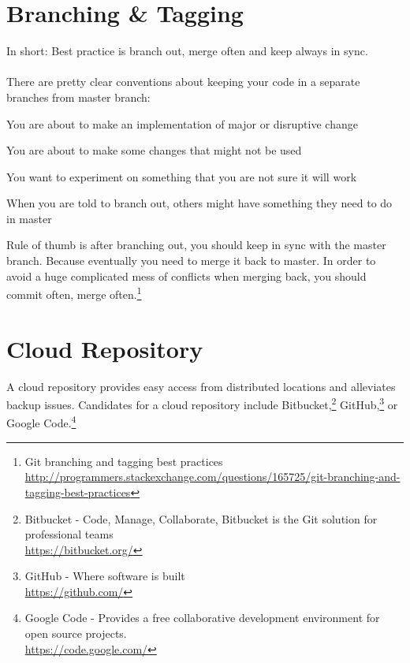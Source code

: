 \documentclass[12pt,letterpaper,dvips]{article}
\newenvironment{enumerate*}%
  {\begin{enumerate}%
    \setlength{\itemsep}{0pt}%
    \setlength{\parsep}{0pt}}%
  {\end{enumerate}}
\begin{document}
\newpage
\section{Branching \& Tagging}

In short: Best practice is branch out, merge often and keep
always in sync.\\
\\
\noindent There are pretty clear conventions about keeping your
code in a separate branches from master branch:

\begin{enumerate*}
\item You are about to make an implementation of major or
disruptive change
\item You are about to make some changes that might not be used
\item You want to experiment on something that you are not sure
    it will work
\item When you are told to branch out, others might have
    something they need to do in master
\end{enumerate*}

\noindent Rule of thumb is after branching out, you should keep in sync with
the master branch. Because eventually you need to merge it back to master. In
order to avoid a huge complicated mess of conflicts when merging back, you
should commit often, merge often.\footnote{Git branching and tagging best
practices\\
\href{http://programmers.stackexchange.com/questions/165725/git-branching-and-tagging-best-practices}{http://programmers.stackexchange.com/questions/165725/git-branching-and-tagging-best-practices}}


\newpage
\section{Cloud Repository}
A cloud repository provides easy access from distributed
locations and alleviates backup issues.  Candidates for
a cloud repository include Bitbucket,\footnote{Bitbucket - Code, Manage, Collaborate,
Bitbucket is the Git solution for professional teams\\
\href{https://bitbucket.org/}{https://bitbucket.org/}}
GitHub,\footnote{GitHub - Where software is built\\
\href{https://github.com/}{https://github.com/}}
or Google Code.\footnote{Google Code - Provides a free collaborative development environment
for open source projects.\\
\href{https://code.google.com/}{https://code.google.com/}}
\end{document}
